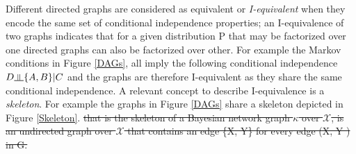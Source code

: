 \documentclass[7pt]{article}
\newcommand{\inperp}{\rotatebox[origin=c]{90}{$\models$}}
\begin{document}
Different directed graphs are considered as equivalent or \emph{I-equivalent} when they encode the same set of conditional independence properties; an I-equivalence of two graphs indicates that for a given distribution P that may be factorized over one directed graphs can also be factorized over other. For example the Markov conditions in Figure \ref{DAGs}, all imply the following conditional independence $D \inperp \{A,B\} | C$ and the graphs are therefore I-equivalent as they share the same conditional independence. A relevant concept to describe I-equivalence is a \emph{skeleton}. For example the graphs in Figure \ref{DAGs} share a skeleton depicted in Figure \ref{Skeleton}. \st{that is the skeleton of a Bayesian network graph $\mathcal{\kappa}$ over $\mathcal{X}$, is an undirected graph over $\mathcal{X}$ that contains an edge \{X, Y\} for every edge (X, Y ) in G.}
		
\end{document}
